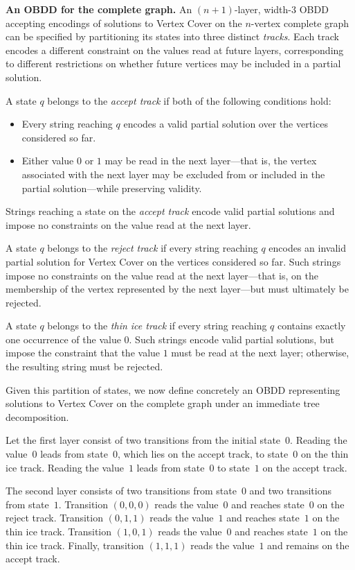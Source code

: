 \medskip
\noindent\textbf{An OBDD for the complete graph.}
An $(n+1)$-layer, width-$3$ OBDD accepting encodings of solutions to
{\sc Vertex Cover} on the $n$-vertex complete graph can be specified by
partitioning its states into three distinct \emph{tracks}. Each track encodes a
different constraint on the values read at future layers, corresponding to
different restrictions on whether future vertices may be included in a partial
solution.

A state $q$ belongs to the \emph{accept track} if both of the following
conditions hold:
\begin{itemize}
    \item Every string reaching $q$ encodes a valid partial solution over the
    vertices considered so far.
    \item Either value $0$ or $1$ may be read in the next layer—that is, the
    vertex associated with the next layer may be excluded from or included in
    the partial solution—while preserving validity.
\end{itemize}

Strings reaching a state on the \emph{accept track} encode valid partial
solutions and impose no constraints on the value read at the next layer.

A state $q$ belongs to the \emph{reject track} if every string reaching $q$
encodes an invalid partial solution for {\sc Vertex Cover} on the vertices
considered so far. Such strings impose no constraints on the value read at the
next layer—that is, on the membership of the vertex represented by the next
layer—but must ultimately be rejected.

A state $q$ belongs to the \emph{thin ice track} if every string reaching $q$
contains exactly one occurrence of the value $0$. Such strings encode valid
partial solutions, but impose the constraint that the value $1$ must be read at
the next layer; otherwise, the resulting string must be rejected.

Given this partition of states, we now define concretely an OBDD representing
solutions to {\sc Vertex Cover} on the complete graph under an immediate tree
decomposition.

Let the first layer consist of two transitions from the initial state~$0$.
Reading the value~$0$ leads from state~$0$, which lies on the accept track, to
state~$0$ on the thin ice track. Reading the value~$1$ leads from state~$0$ to
state~$1$ on the accept track.

The second layer consists of two transitions from state~$0$ and two transitions
from state~$1$. Transition $(0,0,0)$ reads the value~$0$ and reaches state~$0$ on
the reject track. Transition $(0,1,1)$ reads the value~$1$ and reaches state~$1$
on the thin ice track. Transition $(1,0,1)$ reads the value~$0$ and reaches
state~$1$ on the thin ice track. Finally, transition $(1,1,1)$ reads the
value~$1$ and remains on the accept track.

